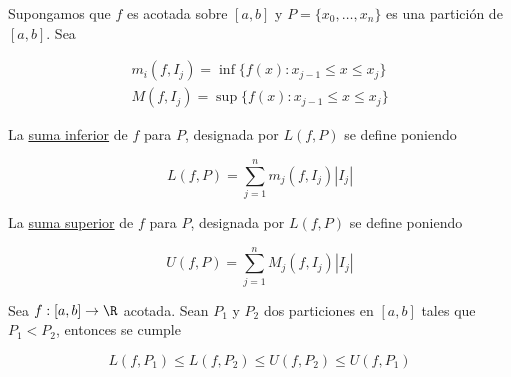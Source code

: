 \begin{defn}
    Supongamos que $f$ es acotada sobre $[a,b]$ y $P = \{ x_0, \dots, x_n \}$ es una partición de $[a,b]$. Sea

    \begin{gather*}
        m_i(f, I_j) = \inf \{ f(x) : x_{j-1} \leq x \leq x_j \} \\
        M(f, I_j) = \sup \{ f(x) : x_{j-1} \leq x \leq x_j \}
    \end{gather*}
    
    La \ul{suma inferior} de $f$ para $P$, designada por $L(f,P)$ se define poniendo
    
    \[
    L(f, P) = \sum_{j=1}^n m_j(f, I_j)|I_j|
    \]
    
    La \ul{suma superior} de $f$ para $P$, designada por $L(f,P)$ se define poniendo
    
    \[
    U(f, P) = \sum_{j=1}^n M_j(f, I_j)|I_j|
    \]
\end{defn}

\begin{teo}
    Sea $f: [a,b] \rightarrow \R$ acotada. Sean $P_1$ y $P_2$ dos particiones en $[a,b]$ tales que $P_1 < P_2$, entonces se cumple

    \[
    L(f, P_1) \leq L(f, P_2) \leq U(f, P_2) \leq U(f, P_1)
    \]
\end{teo}

